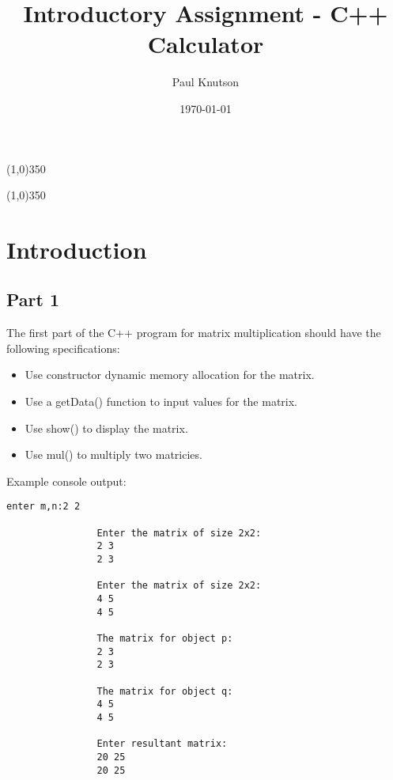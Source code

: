 \documentclass{article}
\begin{document}
	\title{Introductory Assignment - C++ Calculator}
	\date{\today}
	\author{Paul Knutson}
	\maketitle
	\thispagestyle{empty}
	
	\begin{center}
		\line(1,0){350}
	\end{center}
	
	\hfill \break
	
	
	\begin{center}
		\line(1,0){350}
	\end{center}
	
	\clearpage

	\tableofcontents{}
	\clearpage
	
	
	
	\section{Introduction}
		\subsection{Part 1}
			The first part of the C++ program for matrix multiplication should have the following specifications:
			\begin{itemize}
				\item Use constructor dynamic memory allocation for the matrix.
				\item Use a getData() function to input values for the matrix.
				\item Use show() to display the matrix.
				\item Use mul() to multiply two matricies.
			\end{itemize}
		
			Example console output:
			\begin{lstlisting}[style=console]
				enter m,n:2 2
				
				Enter the matrix of size 2x2:
				2 3
				2 3
				
				Enter the matrix of size 2x2:
				4 5
				4 5
				
				The matrix for object p:
				2 3
				2 3
				
				The matrix for object q:
				4 5
				4 5
				
				Enter resultant matrix:
				20 25
				20 25
			\end{lstlisting}
		
\end{document}
